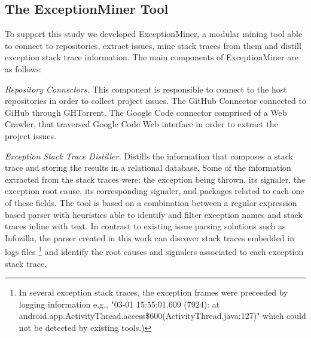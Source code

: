 \documentclass[conference]{IEEEtran}
\begin{document}


\subsection{The ExceptionMiner Tool}
\label{sec:exceptionminer}

To support this study we developed ExceptionMiner, a modular mining tool able 
to connect to repositories, extract issues, mine stack traces from
them and distill exception stack trace information. The main components of
ExceptionMiner are as follows:

\noindent\emph{Repository Connectors.}  This component is responsible to connect to
 the host repositories in order to collect project issues. The GitHub Connector connected
 to GiHub through GHTorrent. The Google Code connector comprised of a Web Crawler,
 that traversed Google Code Web interface in order to extract the project issues.

\noindent\emph{Exception Stack Trace Distiller.} 
Distills the information that composes a stack trace and storing the results in a
relational database. Some of the information extracted from the stack traces were:
 the exception being thrown, its signaler, the exception root cause, its corresponding signaler,
and packages related to each one of these fields.
The tool is based on a combination between a regular expression based parser 
with heuristics able to identify and filter exception names and stack traces inline with text. In
contrast to existing issue parsing solutions such as Infozilla, the parser
created in this work can discover stack traces embedded in logs files \footnote{In several 
exception stack traces, the exception frames were preceeded by logging information e.g., "03-01 15:55:01.609 (7924): at android.app.ActivityThread.access\$600(ActivityThread.java:127)" which could not be detected by existing tools.)}  
and identify the root causes and signalers associated to each exception stack trace.
\end{document}
